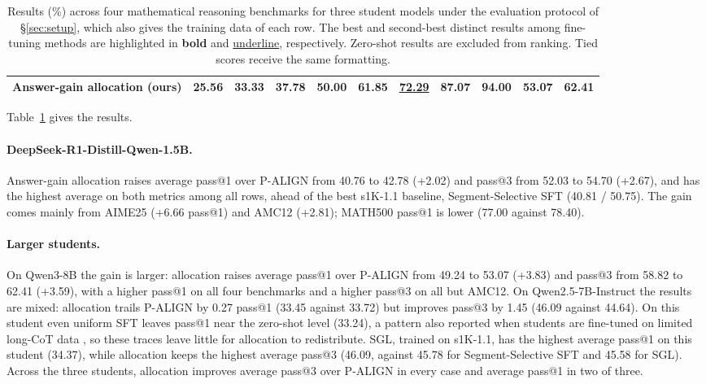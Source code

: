 \documentclass[11pt]{article}
\newcommand{\uniformpalign}{P-ALIGN}
\begin{document}
\begin{table}[t]
\begin{tabular}{lcccccccccc}
    Answer-gain allocation (ours)
    & \textbf{25.56} & \textbf{33.33}
    & \textbf{37.78} & \textbf{50.00}
    & \textbf{61.85} & \underline{72.29}
    & \textbf{87.07} & \textbf{94.00}
    & \textbf{53.07} & \textbf{62.41} \\

    \bottomrule
  \end{tabular}
  \caption{
    Results (\%) across four mathematical reasoning benchmarks
    for three student models under the evaluation protocol of
    \S\ref{sec:setup}, which also gives the training data of each row.
    The best and second-best distinct results among fine-tuning
    methods are highlighted in \textbf{bold} and
    \underline{underline}, respectively.
    Zero-shot results are excluded from ranking.
    Tied scores receive the same formatting.
  }
  \label{tab:main}
\end{table}

Table~\ref{tab:main} gives the results.

\paragraph{DeepSeek-R1-Distill-Qwen-1.5B.}
Answer-gain allocation raises average pass@1 over \uniformpalign{} from 40.76 to 42.78 (+2.02) and pass@3 from 52.03 to 54.70 (+2.67), and has the highest average on both metrics among all rows, ahead of the best s1K-1.1 baseline, Segment-Selective SFT (40.81 / 50.75).
The gain comes mainly from AIME25 (+6.66 pass@1) and AMC12 (+2.81); MATH500 pass@1 is lower (77.00 against 78.40).

\paragraph{Larger students.}
On Qwen3-8B the gain is larger: allocation raises average pass@1 over \uniformpalign{} from 49.24 to 53.07 (+3.83) and pass@3 from 58.82 to 62.41 (+3.59), with a higher pass@1 on all four benchmarks and a higher pass@3 on all but AMC12.
On Qwen2.5-7B-Instruct the results are mixed: allocation trails \uniformpalign{} by 0.27 pass@1 (33.45 against 33.72) but improves pass@3 by 1.45 (46.09 against 44.64).
On this student even uniform SFT leaves pass@1 near the zero-shot level (33.24), a pattern also reported when students are fine-tuned on limited long-CoT data \citep{luo2025valley}, so these traces leave little for allocation to redistribute.
SGL, trained on s1K-1.1, has the highest average pass@1 on this student (34.37), while allocation keeps the highest average pass@3 (46.09, against 45.78 for Segment-Selective SFT and 45.58 for SGL).
Across the three students, allocation improves average pass@3 over \uniformpalign{} in every case and average pass@1 in two of three.
\end{document}
